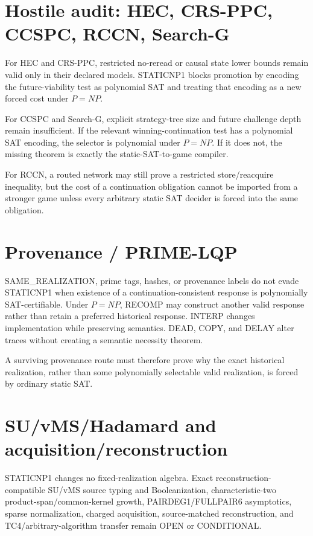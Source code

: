 \documentclass[11pt]{article}
\begin{document}
\section*{Hostile audit: HEC, CRS-PPC, CCSPC, RCCN, Search-G}
For HEC and CRS-PPC, restricted no-reread or causal state lower bounds remain valid only in their declared models. STATICNP1 blocks promotion by encoding the future-viability test as polynomial SAT and treating that encoding as a new forced cost under \(P=NP\).

For CCSPC and Search-G, explicit strategy-tree size and future challenge depth remain insufficient. If the relevant winning-continuation test has a polynomial SAT encoding, the selector is polynomial under \(P=NP\). If it does not, the missing theorem is exactly the static-SAT-to-game compiler.

For RCCN, a routed network may still prove a restricted store/reacquire inequality, but the cost of a continuation obligation cannot be imported from a stronger game unless every arbitrary static SAT decider is forced into the same obligation.

\section*{Provenance / PRIME-LQP}
SAME\_REALIZATION, prime tags, hashes, or provenance labels do not evade STATICNP1 when existence of a continuation-consistent response is polynomially SAT-certifiable. Under \(P=NP\), RECOMP may construct another valid response rather than retain a preferred historical response. INTERP changes implementation while preserving semantics. DEAD, COPY, and DELAY alter traces without creating a semantic necessity theorem.

A surviving provenance route must therefore prove why the exact historical realization, rather than some polynomially selectable valid realization, is forced by ordinary static SAT.

\section*{SU/vMS/Hadamard and acquisition/reconstruction}
STATICNP1 changes no fixed-realization algebra. Exact reconstruction-compatible SU/vMS source typing and Booleanization, characteristic-two product-span/common-kernel growth, PAIRDEG1/FULLPAIR6 asymptotics, sparse normalization, charged acquisition, source-matched reconstruction, and TC4/arbitrary-algorithm transfer remain OPEN or CONDITIONAL.
\end{document}
